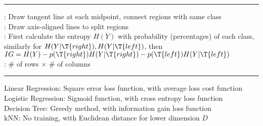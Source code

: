 \documentclass[10pt]{LatexTemplate/hw}
\begin{document}
\begin{multicols*}{5}
\rule{\linewidth}{0.4pt}
: Draw tangent line at each midpoint, connect regions with same class\\
: Draw axis-aligned lines to split regions\\
: First calculate the entropy $H(Y)$ with probability (percentages) of each class, similarly for $H(Y|\T{right}),H(Y|\T{left})$, then $IG=H(Y)-p(\T{right})H(Y|\T{right})-p(\T{left})H(Y|\T{left})$\\
: \# of rows $\times$ \# of columns\\
\rule{\linewidth}{0.4pt}
Linear Regression: Square error loss function, with average loss cost function\\
Logistic Regression: Sigmoid function, with cross entropy loss function\\
Decision Tree: Greedy method, with information gain loss function\\
kNN: No training, with Euclidean distance for lower dimension $D$\\


\end{multicols*}
\end{document}

